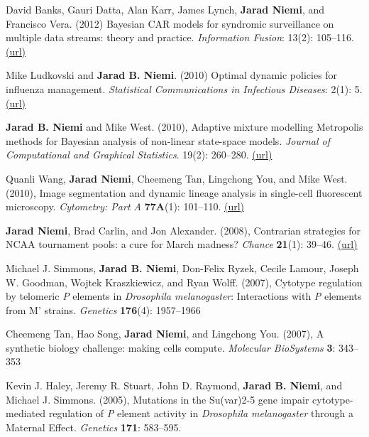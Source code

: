 \documentclass[overlapped,line]{res}
\begin{document}
\begin{resume}
David Banks, Gauri Datta, Alan Karr, James Lynch, {\bf Jarad Niemi}, and Francisco Vera. (2012) Bayesian CAR models for syndromic surveillance on multiple data streams: theory and practice. \emph{Information Fusion}: 13(2): 105--116. \href{http://www.sciencedirect.com/science/article/pii/S156625350900092X}{(url)}

Mike Ludkovski and {\bf Jarad B. Niemi}. (2010) Optimal dynamic policies for influenza management. \emph{Statistical Communications in Infectious Diseases}: 2(1): 5. \href{http://www.degruyter.com/view/j/scid.2010.2.1/scid.2010.2.1.1020/scid.2010.2.1.1020.xml}{(url)}

{\bf Jarad B. Niemi} and Mike West. (2010), Adaptive mixture modelling Metropolis methods for Bayesian analysis of non-linear state-space models. \emph{Journal of Computational and Graphical Statistics}. 19(2): 260--280. \href{http://www.tandfonline.com/doi/abs/10.1198/jcgs.2010.08117}{(url)}

Quanli Wang, {\bf Jarad Niemi}, Cheemeng Tan, Lingchong You, and Mike West. (2010), Image segmentation and dynamic lineage analysis in single-cell fluorescent microscopy. \emph{Cytometry: Part A} {\bf 77A}(1): 101--110. \href{http://onlinelibrary.wiley.com/doi/10.1002/cyto.a.20812/full}{(url)}

{\bf Jarad Niemi}, Brad Carlin, and Jon Alexander. (2008), Contrarian strategies for NCAA tournament pools: a cure for March madness? \emph{Chance} {\bf 21}(1): 39--46. \href{http://amstat.tandfonline.com/doi/pdf/10.1080/09332480.2008.10722884}{(url)}


Michael J. Simmons, {\bf Jarad B. Niemi}, Don-Felix Ryzek, Cecile Lamour, Joseph W. Goodman, Wojtek Kraszkiewicz, and Ryan Wolff. (2007), Cytotype regulation by telomeric \emph{P} elements in \emph{Drosophila melanogaster}: Interactions with \emph{P} elements from M' strains. \emph{Genetics} {\bf 176}(4): 1957--1966

Cheemeng Tan, Hao Song, {\bf Jarad Niemi}, and Lingchong You. (2007), A synthetic biology challenge: making cells compute. \emph{Molecular BioSystems}  {\bf 3}: 343--353

Kevin J. Haley, Jeremy R. Stuart, John D. Raymond, {\bf Jarad B. Niemi}, and Michael J. Simmons. (2005), Mutations in the Su(var)2-5 gene impair cytotype-mediated regulation of \emph{P} element activity in \emph{Drosophila melanogaster} through a Maternal Effect. \emph{Genetics} {\bf 171}: 583--595.







\end{resume}
\end{document}
